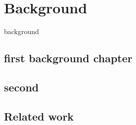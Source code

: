 \chapter{Background}
\label{chap:grundlagen}

background

\section{first background chapter}
\label{sec:networks}

\section{second}
\label{sec:ie}

\section{Related work}
\label{sec:related}
